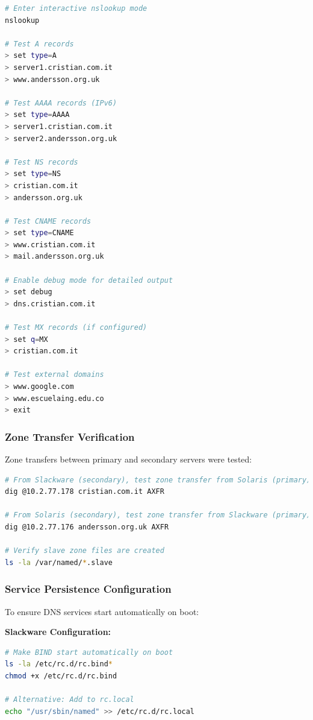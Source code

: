 \documentclass[12pt,a4paper]{article}
\begin{document}
\begin{lstlisting}[language=bash, caption=Advanced nslookup Commands]
# Enter interactive nslookup mode
nslookup

# Test A records
> set type=A
> server1.cristian.com.it
> www.andersson.org.uk

# Test AAAA records (IPv6)
> set type=AAAA
> server1.cristian.com.it
> server2.andersson.org.uk

# Test NS records
> set type=NS
> cristian.com.it
> andersson.org.uk

# Test CNAME records
> set type=CNAME
> www.cristian.com.it
> mail.andersson.org.uk

# Enable debug mode for detailed output
> set debug
> dns.cristian.com.it

# Test MX records (if configured)
> set q=MX
> cristian.com.it

# Test external domains
> www.google.com
> www.escuelaing.edu.co
> exit
\end{lstlisting}

\subsubsection{Zone Transfer Verification}
Zone transfers between primary and secondary servers were tested:

\begin{lstlisting}[language=bash, caption=Zone Transfer Testing]
# From Slackware (secondary), test zone transfer from Solaris (primary)
dig @10.2.77.178 cristian.com.it AXFR

# From Solaris (secondary), test zone transfer from Slackware (primary)
dig @10.2.77.176 andersson.org.uk AXFR

# Verify slave zone files are created
ls -la /var/named/*.slave
\end{lstlisting}

\subsubsection{Service Persistence Configuration}
To ensure DNS services start automatically on boot:

\textbf{Slackware Configuration:}
\begin{lstlisting}[language=bash, caption=Slackware Service Persistence]
# Make BIND start automatically on boot
ls -la /etc/rc.d/rc.bind*
chmod +x /etc/rc.d/rc.bind

# Alternative: Add to rc.local
echo "/usr/sbin/named" >> /etc/rc.d/rc.local
\end{lstlisting}
\end{document}
